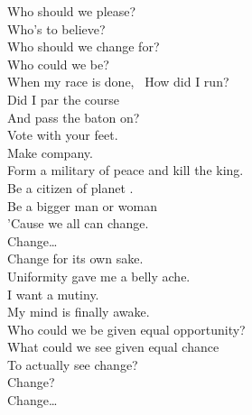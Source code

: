 
\label{album:changes}





Who should we please? \\
Who's to believe? \\
Who should we change for? \\
Who could we be? \\
When my race is done, \
How did I run? \\
Did I par the course \\
And pass the baton on? \\

Vote with your feet. \\
Make company. \\
Form a military of peace and kill the king. \\
Be a citizen of planet . \\
Be a bigger man or woman \\
'Cause we all can change. \\

Change… \\

Change for its own sake. \\
Uniformity gave me a belly ache. \\
I want a mutiny. \\
My mind is finally awake. \\
Who could we be given equal opportunity? \\
What could we see given equal chance \\
To actually see change? \\

Change? \\
Change… \\


